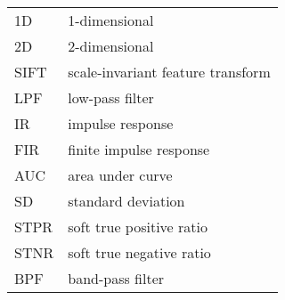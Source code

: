 \begin{tabular}{p{} p{}}

    1D & 1-dimensional \\
    2D & 2-dimensional \\
    SIFT & scale-invariant feature transform \\
    LPF & low-pass filter \\
    IR & impulse response \\
    FIR & finite impulse response \\
    AUC & area under curve \\
    SD & standard deviation \\
    STPR & soft true positive ratio \\
    STNR & soft true negative ratio \\
    BPF & band-pass filter \\

\end{tabular}


